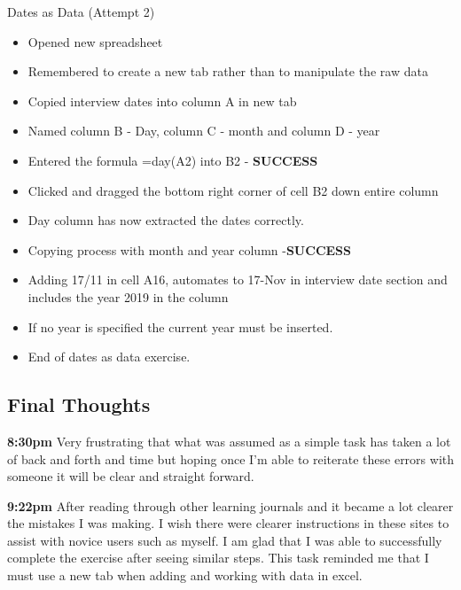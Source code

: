 \documentclass{article}
\begin{document}
Dates as Data (Attempt 2)

\begin{itemize}
\item Opened new spreadsheet 
\item Remembered to create a new tab rather than to manipulate the raw data
\item Copied interview dates into column A in new tab
\item Named column B - Day, column C - month and column D - year
\item Entered the formula =day(A2) into B2 -\textbf{ SUCCESS}
\item Clicked and dragged the bottom right corner of cell B2 down entire column
\item Day column has now extracted the dates correctly.
\item Copying process with month and year column -\textbf{SUCCESS}
\item Adding 17/11 in cell A16, automates to 17-Nov in interview date section and includes the year 2019 in the column
\item If no year is specified the current year must be inserted.
\item End of dates as data exercise.

\end{itemize}





\subsection{Final Thoughts}
\textbf{8:30pm} Very frustrating that what was assumed as a simple task has taken a lot of back and forth and time but hoping once I'm able to reiterate these errors with someone it will be clear and straight forward. 


\textbf{9:22pm} After reading through other learning journals and it became a lot clearer the mistakes I was making. I wish there were clearer instructions in these sites to assist with novice users such as myself. I am glad that I was able to successfully complete the exercise after seeing similar steps. This task reminded me that I must use a new tab when adding and working with data in excel. 
\end{document}
